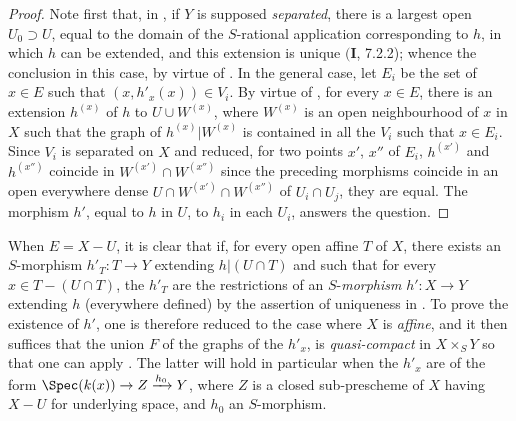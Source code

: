 \begin{proof}
Note first that, in , if $Y$ is supposed \emph{separated}, there is a largest open $U_0\supset U$, equal to the domain of the $S$-rational application corresponding to $h$, in which $h$ can be extended, and this extension is unique $(\mathbf{I}$, 7.2.2);
whence the conclusion in this case, by virtue of .
In the general case, let $E_i$ be the set of $x\in E$ such that $(x,h'_x(x))\in V_i$.
By virtue of , for every $x\in E$, there is an extension $h^{(x)}$ of $h$ to $U\cup W^{(x)}$, where $W^{(x)}$ is an open neighbourhood of $x$ in $X$ such that the graph of $h^{(x)}|W^{(x)}$ is contained in all the $V_i$ such that $x\in E_i$.
Since $V_i$ is separated on $X$ and reduced, for two points $x'$, $x''$ of $E_i$, $h^{(x')}$ and $h^{(x'')}$ coincide in $W^{(x')}\cap W^{(x'')}$ since the preceding morphisms coincide in an open everywhere dense $U\cap W^{(x')}\cap W^{(x'')}$ of $U_i\cap U_j$, they are equal.
The morphism $h'$, equal to $h$ in $U$, to $h_i$ in each $U_i$, answers the question.
\end{proof}

\begin{remark}[20.4.8]
\label{IV.20.4.8}
When $E=X-U$, it is clear that if, for every open affine $T$ of $X$, there exists an $S$-morphism $h'_T:T\to Y$ extending $h|(U\cap T)$ and such that for every $x\in T-(U\cap T)$, the $h'_T$ are the restrictions of an $S$-\emph{morphism} $h':X\to Y$ extending $h$ (everywhere defined) by the assertion of uniqueness in .
To prove the existence of $h'$, one is therefore reduced to the case where $X$ is \emph{affine}, and it then suffices that the union $F$ of the graphs of the $h'_x$, is \emph{quasi-compact} in $X\times_S Y$ so that one can apply .
The latter will hold in particular when the $h'_x$ are of the form $\Spec(k(x))\to Z\xrightarrow{h_0}Y$, where $Z$ is a closed sub-prescheme of $X$ having $X-U$ for underlying space, and $h_0$ an $S$-morphism.
\end{remark}

